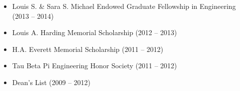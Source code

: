 \documentclass[10.5pt,letterpaper]{article}
\begin{document}
\spacedhrule{0.5em}{-0.5em}
\begin{itemize}
	\setlength{\parskip}{0em}
	\item Louis S. \& Sara S. Michael Endowed Graduate Fellowship in Engineering (2013 -- 2014)
	\item Louis A. Harding Memorial Scholarship (2012 -- 2013)
	\item H.A. Everett Memorial Scholarship (2011 -- 2012)
	\item Tau Beta Pi Engineering Honor Society (2011 -- 2012)
	\item Dean's List (2009 -- 2012)
\end{itemize}
\end{document}
